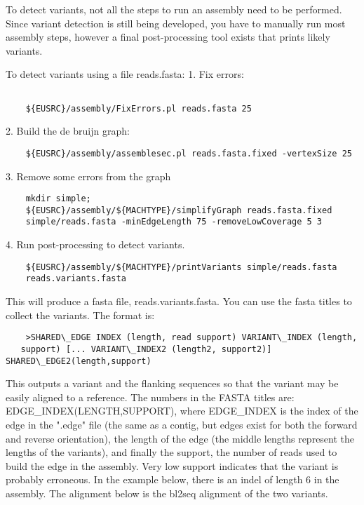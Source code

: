 \documentclass{article}[12pt]
\begin{document}
	To detect variants, not all the steps to run an assembly need to be
	performed.  Since variant detection is still being developed, you
	have to manually run most assembly steps, however a final
	post-processing tool exists that prints likely variants.

	To detect variants using a file reads.fasta:
	1. Fix errors:
\begin{verbatim}
	
	${EUSRC}/assembly/FixErrors.pl reads.fasta 25
\end{verbatim}

	2. Build the de bruijn graph:
	
\begin{verbatim}
	${EUSRC}/assembly/assemblesec.pl reads.fasta.fixed -vertexSize 25
\end{verbatim}
	
	3. Remove some errors from the graph

\begin{verbatim}
	mkdir simple;
	${EUSRC}/assembly/${MACHTYPE}/simplifyGraph reads.fasta.fixed
	simple/reads.fasta -minEdgeLength 75 -removeLowCoverage 5 3
\end{verbatim}

	4. Run post-processing to detect variants.

\begin{verbatim}
	${EUSRC}/assembly/${MACHTYPE}/printVariants simple/reads.fasta
	reads.variants.fasta
\end{verbatim}

	This will produce a fasta file, reads.variants.fasta.  You can use
	the fasta titles to collect the variants.  The format is:

\begin{verbatim}
	>SHARED\_EDGE INDEX (length, read support) VARIANT\_INDEX (length,
   support) [... VARIANT\_INDEX2 (length2, support2)] SHARED\_EDGE2(length,support)
\end{verbatim}
	
This outputs a variant and the flanking sequences so that the variant
may be easily aligned to a reference.  The numbers in the FASTA titles
are: EDGE\_INDEX(LENGTH,SUPPORT), where EDGE\_INDEX is the index of the
edge in the ".edge" file (the same as a contig, but edges exist for
both the forward and reverse orientation), the length of the edge (the
middle lengths represent the lengths of the variants), and finally the
support, the number of reads used to build the edge in the assembly.
Very low support indicates that the variant is probably erroneous.  In
the example below, there is an indel of length 6 in the assembly.  The
alignment below is the bl2seq alignment of the two variants.
\end{document}
